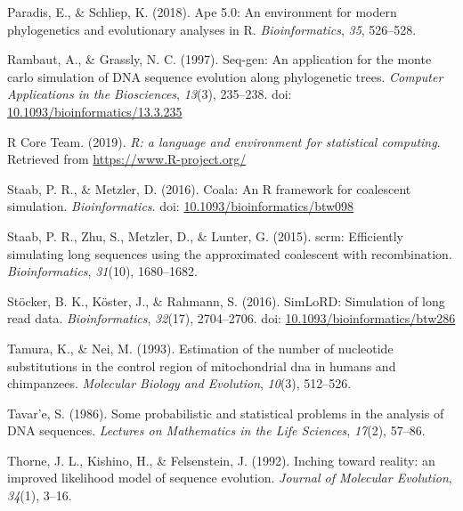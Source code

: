 \documentclass[12pt,]{article}
\begin{document}
\leavevmode\hypertarget{ref-Paradis_2018}{}%
Paradis, E., \& Schliep, K. (2018). Ape 5.0: An environment for modern phylogenetics and evolutionary analyses in R. \emph{Bioinformatics}, \emph{35}, 526--528.

\leavevmode\hypertarget{ref-Rambaut_1997}{}%
Rambaut, A., \& Grassly, N. C. (1997). Seq-gen: An application for the monte carlo simulation of DNA sequence evolution along phylogenetic trees. \emph{Computer Applications in the Biosciences}, \emph{13}(3), 235--238. doi: \href{https://doi.org/10.1093/bioinformatics/13.3.235}{10.1093/bioinformatics/13.3.235}

\leavevmode\hypertarget{ref-R_Core_Team_2019}{}%
R Core Team. (2019). \emph{R: a language and environment for statistical computing}. Retrieved from \url{https://www.R-project.org/}

\leavevmode\hypertarget{ref-Paul_R._Staab_2016}{}%
Staab, P. R., \& Metzler, D. (2016). Coala: An R framework for coalescent simulation. \emph{Bioinformatics}. doi: \href{https://doi.org/10.1093/bioinformatics/btw098}{10.1093/bioinformatics/btw098}

\leavevmode\hypertarget{ref-Paul_R._Staab_2015}{}%
Staab, P. R., Zhu, S., Metzler, D., \& Lunter, G. (2015). scrm: Efficiently simulating long sequences using the approximated coalescent with recombination. \emph{Bioinformatics}, \emph{31}(10), 1680--1682.

\leavevmode\hypertarget{ref-St_cker_2016}{}%
Stöcker, B. K., Köster, J., \& Rahmann, S. (2016). SimLoRD: Simulation of long read data. \emph{Bioinformatics}, \emph{32}(17), 2704--2706. doi: \href{https://doi.org/10.1093/bioinformatics/btw286}{10.1093/bioinformatics/btw286}

\leavevmode\hypertarget{ref-TN93}{}%
Tamura, K., \& Nei, M. (1993). Estimation of the number of nucleotide substitutions in the control region of mitochondrial dna in humans and chimpanzees. \emph{Molecular Biology and Evolution}, \emph{10}(3), 512--526.

\leavevmode\hypertarget{ref-Tavare_1986gtr}{}%
Tavar\a'e, S. (1986). Some probabilistic and statistical problems in the analysis of DNA sequences. \emph{Lectures on Mathematics in the Life Sciences}, \emph{17}(2), 57--86.

\leavevmode\hypertarget{ref-Thorne_1992}{}%
Thorne, J. L., Kishino, H., \& Felsenstein, J. (1992). Inching toward reality: an improved likelihood model of sequence evolution. \emph{Journal of Molecular Evolution}, \emph{34}(1), 3--16.
\end{document}

